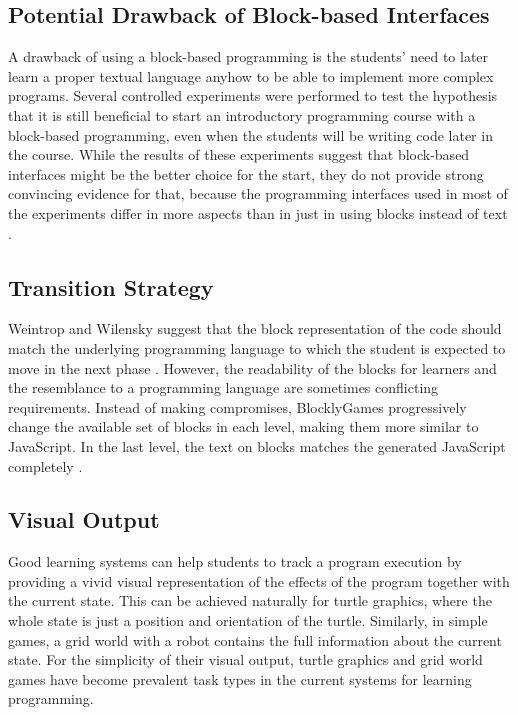\subsection{Potential Drawback of Block-based Interfaces}
\label{sec:potential-drawback-of-block-based-interfaces}
A drawback of using a block-based programming
  is the students' need to later learn a proper textual language anyhow
  to be able to implement more complex programs.
Several controlled experiments were performed to test the hypothesis
  that it is still beneficial to start an introductory programming course
  with a block-based programming,
  even when the students will be writing code later in the course.
While the results of these experiments suggest that block-based interfaces
  might be the better choice for the start,
  they do not provide strong convincing evidence for that,
  because the programming interfaces used in most of the experiments differ in more aspects
  than in just in using blocks instead of text
  \cite{comparing-textual-and-block-interfaces}.

\subsection{Transition Strategy}
\label{sec:transition-strategy}
Weintrop and Wilensky suggest that the block representation of the code
  should match the underlying programming language
  to which the student is expected to move in the next phase
  \cite{challenges-of-blocks-based-environments}.
However, the readability of the blocks for learners
  and the resemblance to a programming language
  are sometimes conflicting requirements.
Instead of making compromises,
  BlocklyGames progressively change the available set of blocks in each level,
  making them more similar to JavaScript.
In the last level,
  the text on blocks matches the generated JavaScript completely
  \cite{blockly-10-things}.


\subsection{Visual Output}
\label{sec:visual-output}

Good learning systems can help students to track a program execution
  by providing a vivid visual representation of the effects of the program
  together with the current state.
This can be achieved naturally for turtle graphics,
  where the whole state is just a position and orientation of the turtle.
Similarly, in simple games, a grid world with a robot
  contains the full information about the current state.
For the simplicity of their visual output,
  turtle graphics and grid world games have become prevalent task types
  in the current systems for learning programming.

